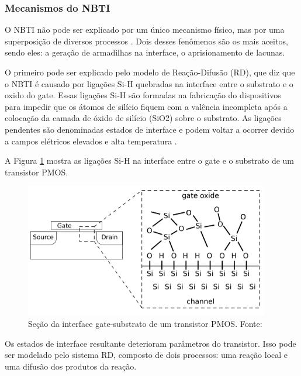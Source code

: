 \subsubsection{Mecanismos do NBTI}


O NBTI não pode ser explicado por um único mecanismo físico, mas por uma superposição de diversos processos \cite{Butzen}. Dois desses fenômenos são os mais aceitos, sendo eles: a geração de armadilhas na interface, o aprisionamento de lacunas.

O primeiro pode ser explicado pelo modelo de Reação-Difusão (RD), que diz que o NBTI é causado por ligações Si-H quebradas na interface entre o substrato e o oxido do gate. Essas ligações Si-H são formadas na fabricação do dispositivos para impedir que os átomos de silício fiquem com a valência incompleta após a colocação da camada de óxido de silício (SiO\small{2}) sobre o substrato. As ligações pendentes são denominadas estados de interface e podem voltar a ocorrer devido a campos elétricos elevados e alta temperatura \cite{Banaszeski}.

A Figura \ref{fig:PmosCrossSec} mostra as ligações Si-H na interface entre o gate e o substrato de um transistor PMOS.

\begin{figure}[H]
    \centering
    \includegraphics[scale=1]{figures/ReferencialTeorico/Cross section of a PMOS transistor.png}
    \caption{Seção da interface gate-substrato de um transistor PMOS. Fonte: \cite{Lorenz}}
    \label{fig:PmosCrossSec}
\end{figure}

Os estados de interface resultante deterioram parâmetros do transistor. Isso pode ser modelado pelo sistema RD, composto de dois processos: uma reação local e uma difusão dos produtos da reação.

